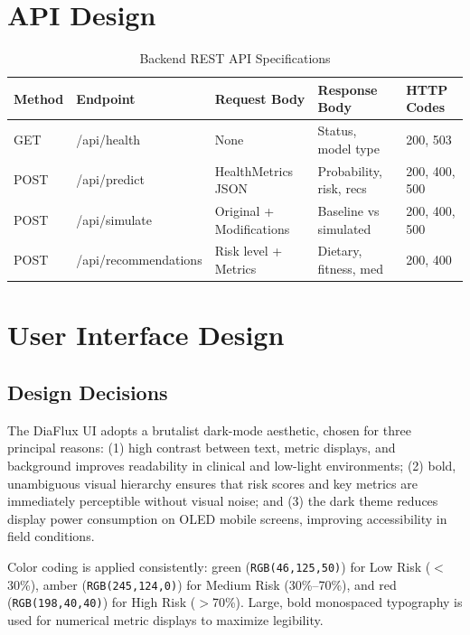 \documentclass[12pt,a4paper]{report}
\begin{document}
\section{API Design}

\begin{table}[H]
\centering
\caption{Backend REST API Specifications}
\label{tab:api_specifications}
\begin{tabularx}{\textwidth}{llp{2.5cm}p{2.8cm}l}
\toprule
\textbf{Method} & \textbf{Endpoint} & \textbf{Request Body} & \textbf{Response Body} & \textbf{HTTP Codes} \\
\midrule
GET  & /api/health          & None                     & Status, model type    & 200, 503 \\
POST & /api/predict         & HealthMetrics JSON       & Probability, risk, recs & 200, 400, 500 \\
POST & /api/simulate        & Original + Modifications & Baseline vs simulated & 200, 400, 500 \\
POST & /api/recommendations & Risk level + Metrics     & Dietary, fitness, med & 200, 400 \\
\bottomrule
\end{tabularx}
\end{table}

\section{User Interface Design}

\subsection{Design Decisions}
The DiaFlux UI adopts a brutalist dark-mode aesthetic, chosen for three principal reasons: (1) high contrast between text, metric displays, and background improves readability in clinical and low-light environments; (2) bold, unambiguous visual hierarchy ensures that risk scores and key metrics are immediately perceptible without visual noise; and (3) the dark theme reduces display power consumption on OLED mobile screens, improving accessibility in field conditions.

Color coding is applied consistently: green (\texttt{RGB(46,125,50)}) for Low Risk ($<$30\%), amber (\texttt{RGB(245,124,0)}) for Medium Risk (30\%--70\%), and red (\texttt{RGB(198,40,40)}) for High Risk ($>$70\%). Large, bold monospaced typography is used for numerical metric displays to maximize legibility.
\end{document}
